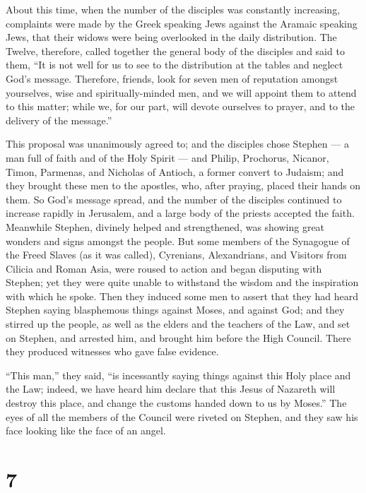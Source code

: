  About this time, when the number of the disciples was
constantly increasing, complaints were made by the Greek speaking Jews
against the Aramaic speaking Jews, that their widows were being
overlooked in the daily distribution.  The Twelve,
therefore, called together the general body of the disciples and said to
them, ``It is not well for us to see to the distribution at the tables
and neglect God's message.  Therefore, friends, look for
seven men of reputation amongst yourselves, wise and spiritually-minded
men, and we will appoint them to attend to this matter; 
while we, for our part, will devote ourselves to prayer, and to the
delivery of the message.''

 This proposal was unanimously agreed to; and the disciples
chose Stephen --- a man full of faith and of the Holy Spirit --- and
Philip, Prochorus, Nicanor, Timon, Parmenas, and Nicholas of Antioch, a
former convert to Judaism;  and they brought these men to
the apostles, who, after praying, placed their hands on them.
 So God's message spread, and the number of the disciples
continued to increase rapidly in Jerusalem, and a large body of the
priests accepted the faith.  Meanwhile Stephen, divinely
helped and strengthened, was showing great wonders and signs amongst the
people.  But some members of the Synagogue of the Freed
Slaves (as it was called), Cyrenians, Alexandrians, and Visitors from
Cilicia and Roman Asia, were roused to action and began disputing with
Stephen;  yet they were quite unable to withstand the
wisdom and the inspiration with which he spoke.  Then they
induced some men to assert that they had heard Stephen saying
blasphemous things against Moses, and against God;  and
they stirred up the people, as well as the elders and the teachers of
the Law, and set on Stephen, and arrested him, and brought him before
the High Council.  There they produced witnesses who gave
false evidence.

``This man,'' they said, ``is incessantly saying things against this
Holy place and the Law;  indeed, we have heard him declare
that this Jesus of Nazareth will destroy this place, and change the
customs handed down to us by Moses.''  The eyes of all the
members of the Council were riveted on Stephen, and they saw his face
looking like the face of an angel.

\hypertarget{section-6}{%
\section{7}\label{section-6}}

